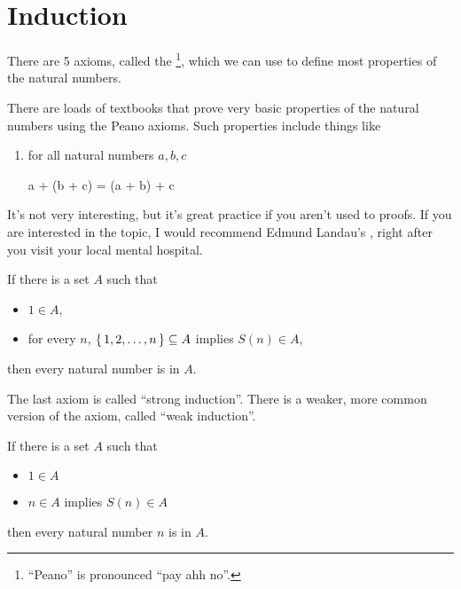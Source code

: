 \section{Induction}

There are 5 axioms, called the \footnote{``Peano''
  is pronounced ``pay ahh no''.}, which we can use to define most
properties of the natural numbers.

\begin{aside}
  There are loads of textbooks that prove very basic properties of the
  natural numbers using the Peano axioms. Such properties include
  things like

  \begin{enumerate}
  \item for all natural numbers $a, b, c$

    \begin{zz}
      a + (b + c) = (a + b) + c
    \end{zz}
  \end{enumerate}

  It's not very interesting, but it's great practice if you aren't
  used to proofs. If you are interested in the topic, I would
  recommend Edmund Landau's 
  \cite{landau}, right after you visit your local mental hospital.
\end{aside}

\begin{definition}
  \label{def:strong-induction}
  If there is a set $A$ such that
    \begin{itemize}
    \item $1 \in A$,
    \item for every $n$, $\left\{ \, 1, 2, \dots, n \, \right\} \subseteq A$ implies
      $S(n) \in A$,
    \end{itemize}

    then every natural number is in $A$.
\end{definition}

The last axiom is called ``strong induction''. There is a weaker, more
common version of the axiom, called ``weak induction''.

\begin{definition}
  \label{def:weak-induction}
  If there is a set $A$ such that

  \begin{itemize}
  \item $1 \in A$
  \item $n \in A$ implies $S(n) \in A$
  \end{itemize}

  then every natural number $n$ is in $A$.
\end{definition}

